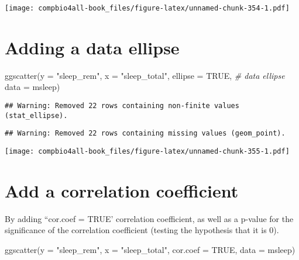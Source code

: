 \documentclass[
]{book}
\newenvironment{Shaded}{\begin{snugshade}}{\end{snugshade}}
\newcommand{\AttributeTok}[1]{\textcolor[rgb]{0.77,0.63,0.00}{#1}}
\newcommand{\CommentTok}[1]{\textcolor[rgb]{0.56,0.35,0.01}{\textit{#1}}}
\newcommand{\ConstantTok}[1]{\textcolor[rgb]{0.00,0.00,0.00}{#1}}
\newcommand{\FunctionTok}[1]{\textcolor[rgb]{0.00,0.00,0.00}{#1}}
\newcommand{\NormalTok}[1]{#1}
\newcommand{\StringTok}[1]{\textcolor[rgb]{0.31,0.60,0.02}{#1}}
\begin{document}
\texttt{[image: compbio4all-book\_files/figure-latex/unnamed-chunk-354-1.pdf]}

\hypertarget{adding-a-data-ellipse-1}{%
\section{Adding a data ellipse}\label{adding-a-data-ellipse-1}}

\begin{Shaded}
\begin{Highlighting}[]
\FunctionTok{ggscatter}\NormalTok{(}\AttributeTok{y =} \StringTok{"sleep\_rem"}\NormalTok{,}
          \AttributeTok{x =} \StringTok{"sleep\_total"}\NormalTok{,}
          \AttributeTok{ellipse =} \ConstantTok{TRUE}\NormalTok{,   }\CommentTok{\# data ellipse}
          \AttributeTok{data =}\NormalTok{ msleep)}
\end{Highlighting}
\end{Shaded}

\begin{verbatim}
## Warning: Removed 22 rows containing non-finite values (stat_ellipse).
\end{verbatim}

\begin{verbatim}
## Warning: Removed 22 rows containing missing values (geom_point).
\end{verbatim}

\texttt{[image: compbio4all-book\_files/figure-latex/unnamed-chunk-355-1.pdf]}

\hypertarget{add-a-correlation-coefficient-1}{%
\section{Add a correlation coefficient}\label{add-a-correlation-coefficient-1}}

By adding ``cor.coef = TRUE' correlation coefficient, as well as a p-value for the significance of the correlation coefficient (testing the hypothesis that it is 0).

\begin{Shaded}
\begin{Highlighting}[]
\FunctionTok{ggscatter}\NormalTok{(}\AttributeTok{y =} \StringTok{"sleep\_rem"}\NormalTok{,}
          \AttributeTok{x =} \StringTok{"sleep\_total"}\NormalTok{,}
          \AttributeTok{cor.coef =} \ConstantTok{TRUE}\NormalTok{,}
          \AttributeTok{data =}\NormalTok{ msleep)}
\end{Highlighting}
\end{Shaded}
\end{document}
